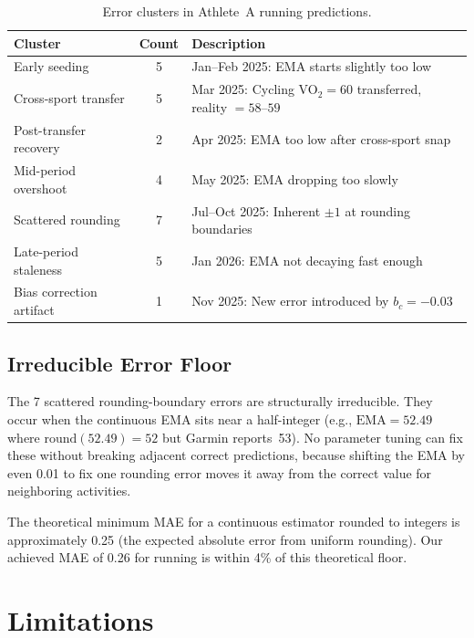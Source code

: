 \documentclass[11pt,a4paper]{article}
\begin{document}
\begin{table}[H]
\centering
\caption{Error clusters in Athlete~A running predictions.}
\label{tab:error-clusters}
\begin{tabular}{@{}lcp{7.5cm}@{}}
\toprule
\textbf{Cluster} & \textbf{Count} & \textbf{Description} \\
\midrule
Early seeding & 5 & Jan--Feb 2025: EMA starts slightly too low \\
Cross-sport transfer & 5 & Mar 2025: Cycling VO$_2 = 60$ transferred, reality $= 58$--$59$ \\
Post-transfer recovery & 2 & Apr 2025: EMA too low after cross-sport snap \\
Mid-period overshoot & 4 & May 2025: EMA dropping too slowly \\
Scattered rounding & 7 & Jul--Oct 2025: Inherent $\pm 1$ at rounding boundaries \\
Late-period staleness & 5 & Jan 2026: EMA not decaying fast enough \\
Bias correction artifact & 1 & Nov 2025: New error introduced by $b_c = -0.03$ \\
\bottomrule
\end{tabular}
\end{table}

\subsection{Irreducible Error Floor}

The 7 scattered rounding-boundary errors are structurally irreducible.
They occur when the continuous EMA sits near a half-integer (e.g., $\text{EMA} = 52.49$ where $\text{round}(52.49) = 52$ but Garmin reports~53).
No parameter tuning can fix these without breaking adjacent correct predictions, because shifting the EMA by even 0.01 to fix one rounding error moves it away from the correct value for neighboring activities.

The theoretical minimum MAE for a continuous estimator rounded to integers is approximately 0.25 (the expected absolute error from uniform rounding).
Our achieved MAE of 0.26 for running is within 4\% of this theoretical floor.


\section{Limitations}
\label{sec:limitations}
\end{document}
